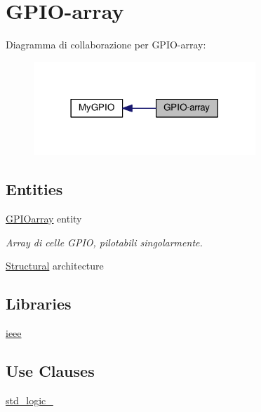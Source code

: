 \hypertarget{group___g_p_i_o-array}{\section{G\+P\+I\+O-\/array}
\label{group___g_p_i_o-array}
}
Diagramma di collaborazione per G\+P\+I\+O-\/array\+:\nopagebreak
\begin{figure}[H]
\begin{center}
\leavevmode
\includegraphics[width=237pt]{group___g_p_i_o-array}
\end{center}
\end{figure}
\subsection*{Entities}
\begin{DoxyCompactItemize}
\item 
\hyperlink{class_g_p_i_oarray}{G\+P\+I\+Oarray} entity
\begin{DoxyCompactList}\small\item\em Array di celle G\+P\+I\+O, pilotabili singolarmente. \end{DoxyCompactList}\item 
\hyperlink{class_g_p_i_oarray_1_1_structural}{Structural} architecture
\end{DoxyCompactItemize}
\subsection*{Libraries}
 \begin{DoxyCompactItemize}
\item 
\hypertarget{group___g_p_i_o-array_ga0a6af6eef40212dbaf130d57ce711256}{\hyperlink{group___g_p_i_o-array_ga0a6af6eef40212dbaf130d57ce711256}{ieee} }\label{group___g_p_i_o-array_ga0a6af6eef40212dbaf130d57ce711256}

\end{DoxyCompactItemize}
\subsection*{Use Clauses}
 \begin{DoxyCompactItemize}
\item 
\hypertarget{group___g_p_i_o-array_gacd03516902501cd1c7296a98e22c6fcb}{\hyperlink{group___g_p_i_o-array_gacd03516902501cd1c7296a98e22c6fcb}{std\+\_\+logic\+\_}   }\label{group___g_p_i_o-array_gacd03516902501cd1c7296a98e22c6fcb}

\end{DoxyCompactItemize}
